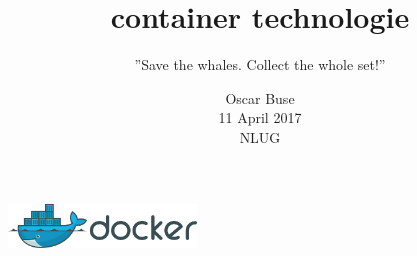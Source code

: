 \documentclass[t,11pt,handout,xcolor=table]{beamer}
\title{container technologie}
\subtitle{
\scriptsize ''Save the whales. Collect the whole set!''
}
\author{Oscar Buse\\
{\small 11 April 2017\\
NLUG}}
\date{}
\begin{document}
    \begin{frontframe}
        \center
        \includegraphics[width=5cm]{img/docker_logo.png}\\
        \titlepage
    \end{frontframe}




    
%	
\end{document}
